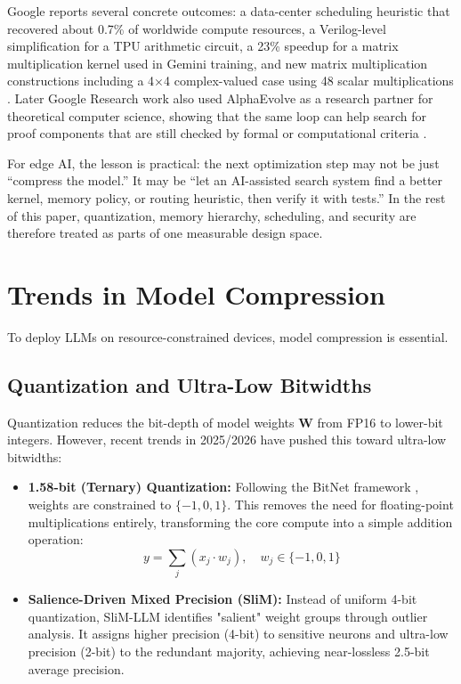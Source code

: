 \documentclass[twocolumn,10pt]{article}
\begin{document}
Google reports several concrete outcomes: a data-center scheduling heuristic that recovered about 0.7\% of worldwide compute resources, a Verilog-level simplification for a TPU arithmetic circuit, a 23\% speedup for a matrix multiplication kernel used in Gemini training, and new matrix multiplication constructions including a 4$\times$4 complex-valued case using 48 scalar multiplications \cite{deepmind_alphaevolve_2025}. Later Google Research work also used AlphaEvolve as a research partner for theoretical computer science, showing that the same loop can help search for proof components that are still checked by formal or computational criteria \cite{google_research_alphaevolve_tcs_2025}.

For edge AI, the lesson is practical: the next optimization step may not be just ``compress the model.'' It may be ``let an AI-assisted search system find a better kernel, memory policy, or routing heuristic, then verify it with tests.'' In the rest of this paper, quantization, memory hierarchy, scheduling, and security are therefore treated as parts of one measurable design space.

\section{Trends in Model Compression}
To deploy LLMs on resource-constrained devices, model compression is essential.

\subsection{Quantization and Ultra-Low Bitwidths}
Quantization reduces the bit-depth of model weights $\mathbf{W}$ from FP16 to lower-bit integers. However, recent trends in 2025/2026 have pushed this toward ultra-low bitwidths:
\begin{itemize}
    \item \textbf{1.58-bit (Ternary) Quantization:} Following the BitNet framework \cite{wang2023bitnet}, weights are constrained to $\{-1, 0, 1\}$. This removes the need for floating-point multiplications entirely, transforming the core compute into a simple addition operation:
    \begin{equation}
    y = \sum_{j} (x_j \cdot w_{j}), \quad w_j \in \{-1, 0, 1\}
    \end{equation}
    \item \textbf{Salience-Driven Mixed Precision (SliM):} Instead of uniform 4-bit quantization, SliM-LLM identifies "salient" weight groups through outlier analysis. It assigns higher precision (4-bit) to sensitive neurons and ultra-low precision (2-bit) to the redundant majority, achieving near-lossless 2.5-bit average precision.
\end{itemize}
\end{document}
